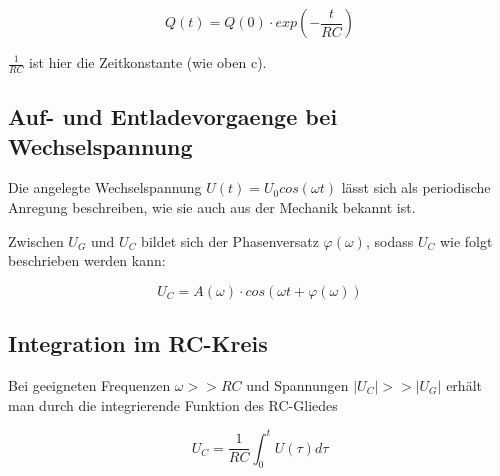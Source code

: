 \begin{equation}
    \label{}
Q(t) = Q(0)\cdot exp(-\frac{t}{RC})
\end{equation}

$\frac{1}{RC}$ ist hier die Zeitkonstante (wie oben c).


\subsection{Auf- und Entladevorgaenge bei Wechselspannung}
\label{subsec:Entladevorgaenge bei Wechselspannung}

Die angelegte Wechselspannung $U(t) = U_0 cos(\omega t)$ lässt sich als periodische Anregung beschreiben, 
wie sie auch aus der Mechanik bekannt ist.

Zwischen $U_G$ und $U_C$ bildet sich der Phasenversatz $\varphi(\omega)$, sodass $U_C$ wie folgt beschrieben werden
kann:

\begin{equation}
    U_C = A(\omega) \cdot cos(\omega t + \varphi(\omega))
\end{equation}


\subsection{Integration im RC-Kreis}
\label{subsec:Integration im RC-Kreis}

Bei geeigneten Frequenzen $\omega >> RC$ und Spannungen $|U_C| >> |U_G|$ erhält man durch die integrierende Funktion des RC-Gliedes 

\begin{equation}
    \label{integrator}
    U_C = \frac{1}{RC} \int_{0}^{t} U(\tau) d\tau
\end{equation}


\cite{sample}
